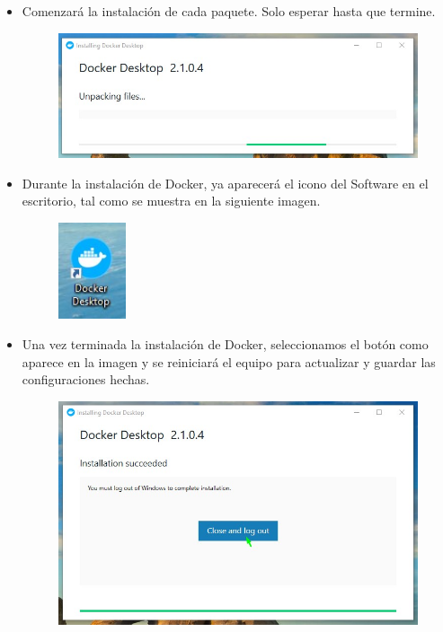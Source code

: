 \begin{itemize}
\begin{figure}[htb]
\begin{center}
					\end{center}
				\end{figure}
			\item Comenzará la instalación de cada paquete. Solo esperar hasta que termine.
				\begin{figure}[htb]
					\begin{center}
						\includegraphics[width=11cm]{./Imagenes/Instalacion03}
					\end{center}
				\end{figure}
				\vspace{10cm}
			\item Durante la instalación de Docker, ya aparecerá el icono del Software en el escritorio, tal como se muestra en la siguiente imagen.
				\begin{figure}[htb]
					\begin{center}
						\includegraphics[width=2cm]{./Imagenes/NuevoIcono}
					\end{center}
				\end{figure}
			\item Una vez terminada la instalación de Docker, seleccionamos el botón como aparece en la imagen y se reiniciará el equipo para actualizar y guardar las configuraciones hechas.
				\begin{figure}[htb]
					\begin{center}
						\includegraphics[width=11cm]{./Imagenes/Instalacion05}
					\end{center}
				\end{figure}

\end{itemize}
